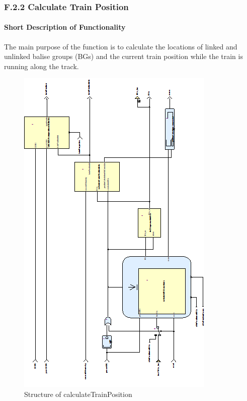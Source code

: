 \subsubsection{F.2.2 Calculate Train Position}\label{sss:calctrainpos}

\paragraph{Short Description of Functionality}
The main purpose of the function is to calculate the locations of linked and unlinked balise groups (BGs) and the current train position while the train is running along the track. 

\begin{figure}[hbtp]
\centering
\includegraphics[scale=1]{../images/CalculateTrainPosition.png}
\caption{Structure of calculateTrainPosition}
\end{figure}


